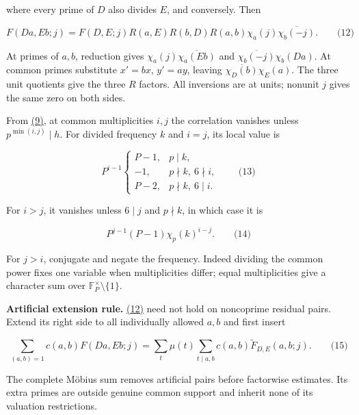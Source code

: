 where every prime of \(D\) also divides \(E\), and conversely. Then

\hypertarget{cf:eq:A.16}{}

\label{cf:eq:A.16}

\[
F(Da,Eb;j)=F(D,E;j)R(a,E)R(b,D)R(a,b)
 \chi_a(j)\overline{\chi_b(-j)}.
\qquad\text{(12)}
\]

At primes of \(a,b\), reduction gives \(\chi_a(j)\overline{\chi_a(Eb)}\) and \(\overline{\chi_b(-j)}\chi_b(Da)\). At common primes substitute \(x'=bx\), \(y'=ay\), leaving \(\overline{\chi_D(b)}\chi_E(a)\). The three unit quotients give the three \(R\) factors. All inversions are at units; nonunit \(j\) gives the same zero on both sides.

From \protect\hyperlink{cf:eq:A.13}{(9)}, at common multiplicities \(i,j\) the correlation vanishes unless \(p^{\min(i,j)}\mid h\). For divided frequency \(k\) and \(i=j\), its local value is

\hypertarget{cf:eq:A.17}{}

\label{cf:eq:A.17}

\[
P^{i-1}\begin{cases}
P-1,&p\mid k,\\
-1,&p\nmid k,\ 6\nmid i,\\
P-2,&p\nmid k,\ 6\mid i.
\end{cases}
\qquad\text{(13)}
\]

For \(i>j\), it vanishes unless \(6\mid j\) and \(p\nmid k\), in which case it is

\hypertarget{cf:eq:A.18}{}

\label{cf:eq:A.18}

\[
P^{j-1}(P-1)\chi_p(k)^{i-j}.
\qquad\text{(14)}
\]

For \(j>i\), conjugate and negate the frequency. Indeed dividing the common power fixes one variable when multiplicities differ; equal multiplicities give a character sum over \(\mathbb F_P^\times\setminus\{1\}\).

\textbf{Artificial extension rule.} \protect\hyperlink{cf:eq:A.16}{(12)} need not hold on noncoprime residual pairs. Extend its right side to all individually allowed \(a,b\) and first insert

\hypertarget{cf:eq:A.19}{}

\label{cf:eq:A.19}

\[
\sum_{(a,b)=1}c(a,b)F(Da,Eb;j)
=\sum_t\mu(t)\sum_{t\mid a,b}c(a,b)\widetilde F_{D,E}(a,b;j).
\qquad\text{(15)}
\]

The complete Möbius sum removes artificial pairs before factorwise estimates. Its extra primes are outside genuine common support and inherit none of its valuation restrictions.


